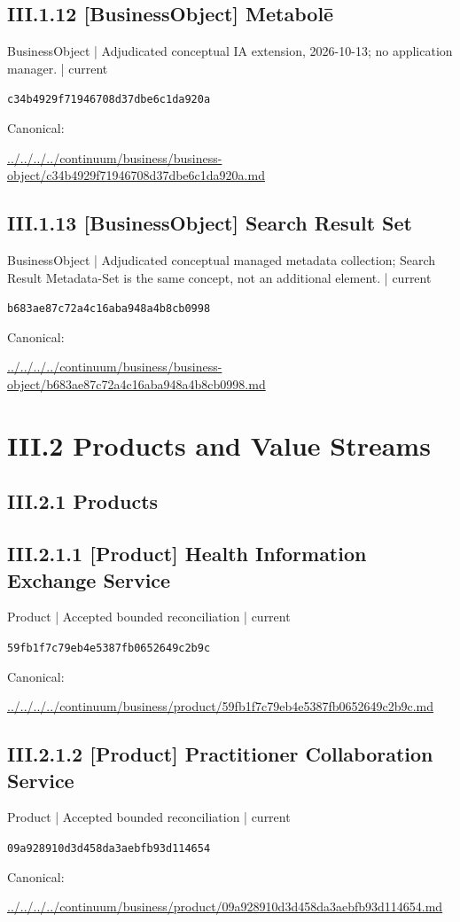 \documentclass[10pt,a4paper]{article}
\begin{document}
\subsection*{III.1.12 [BusinessObject] Metabolē}
{\small BusinessObject | Adjudicated conceptual IA extension, 2026-10-13; no application manager. | current}\par
\texttt{c34b4929f71946708d37dbe6c1da920a}\par
Canonical: \par
{\footnotesize\url{../../../../continuum/business/business-object/c34b4929f71946708d37dbe6c1da920a.md}}\par
\subsection*{III.1.13 [BusinessObject] Search Result Set}
{\small BusinessObject | Adjudicated conceptual managed metadata collection; Search Result Metadata-Set is the same concept, not an additional element. | current}\par
\texttt{b683ae87c72a4c16aba948a4b8cb0998}\par
Canonical: \par
{\footnotesize\url{../../../../continuum/business/business-object/b683ae87c72a4c16aba948a4b8cb0998.md}}\par
\section*{III.2 Products and Value Streams}
\subsection*{III.2.1 Products}
\subsection*{III.2.1.1 [Product] Health Information Exchange Service}
{\small Product | Accepted bounded reconciliation | current}\par
\texttt{59fb1f7c79eb4e5387fb0652649c2b9c}\par
Canonical: \par
{\footnotesize\url{../../../../continuum/business/product/59fb1f7c79eb4e5387fb0652649c2b9c.md}}\par
\subsection*{III.2.1.2 [Product] Practitioner Collaboration Service}
{\small Product | Accepted bounded reconciliation | current}\par
\texttt{09a928910d3d458da3aebfb93d114654}\par
Canonical: \par
{\footnotesize\url{../../../../continuum/business/product/09a928910d3d458da3aebfb93d114654.md}}\par
\end{document}

